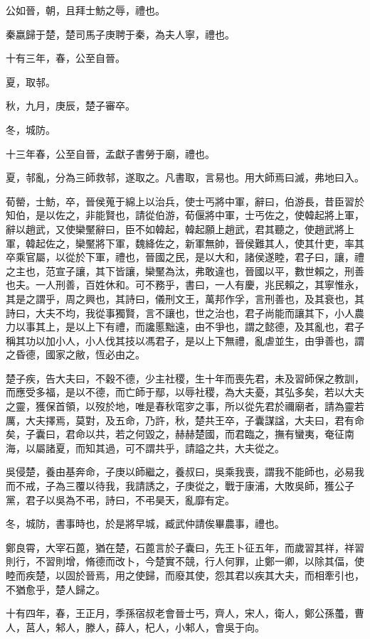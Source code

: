 \begin{pinyinscope}
公如晉，朝，且拜士魴之辱，禮也。

秦嬴歸于楚，楚司馬子庚聘于秦，為夫人寧，禮也。

十有三年，春，公至自晉。

夏，取邿。

秋，九月，庚辰，楚子審卒。

冬，城防。

十三年春，公至自晉，孟獻子書勞于廟，禮也。

夏，邿亂，分為三師救邿，遂取之。凡書取，言易也。用大師焉曰滅，弗地曰入。

荀罃，士魴，卒，晉侯蒐于綿上以治兵，使士丐將中軍，辭曰，伯游長，昔臣習於知伯，是以佐之，非能賢也，請從伯游，荀偃將中軍，士丐佐之，使韓起將上軍，辭以趙武，又使欒黶辭曰，臣不如韓起，韓起願上趙武，君其聽之，使趙武將上軍，韓起佐之，欒黶將下軍，魏絳佐之，新軍無帥，晉侯難其人，使其什吏，率其卒乘官屬，以從於下軍，禮也，晉國之民，是以大和，諸侯遂睦，君子曰，讓，禮之主也，范宣子讓，其下皆讓，欒黶為汰，弗敢違也，晉國以平，數世賴之，刑善也夫。一人刑善，百姓休和。可不務乎，書曰，一人有慶，兆民賴之，其寧惟永，其是之謂乎，周之興也，其詩曰，儀刑文王，萬邦作孚，言刑善也，及其衰也，其詩曰，大夫不均，我從事獨賢，言不讓也，世之治也，君子尚能而讓其下，小人農力以事其上，是以上下有禮，而讒慝黜遠，由不爭也，謂之懿德，及其亂也，君子稱其功以加小人，小人伐其技以馮君子，是以上下無禮，亂虐並生，由爭善也，謂之昏德，國家之敝，恆必由之。

楚子疾，告大夫曰，不穀不德，少主社稷，生十年而喪先君，未及習師保之教訓，而應受多福，是以不德，而亡師于鄢，以辱社稷，為大夫憂，其弘多矣，若以大夫之靈，獲保首領，以歿於地，唯是春秋窀穸之事，所以從先君於禰廟者，請為靈若厲，大夫擇焉，莫對，及五命，乃許，秋，楚共王卒，子囊謀諡，大夫曰，君有命矣，子囊曰，君命以共，若之何毀之，赫赫楚國，而君臨之，撫有蠻夷，奄征南海，以屬諸夏，而知其過，可不謂共乎，請謚之共，大夫從之。

吳侵楚，養由基奔命，子庚以師繼之，養叔曰，吳乘我喪，謂我不能師也，必易我而不戒，子為三覆以待我，我請誘之，子庚從之，戰于康浦，大敗吳師，獲公子黨，君子以吳為不弔，詩曰，不弔昊天，亂靡有定。

冬，城防，書事時也，於是將早城，臧武仲請俟畢農事，禮也。

鄭良霄，大宰石蓖，猶在楚，石蓖言於子囊曰，先王卜征五年，而歲習其祥，祥習則行，不習則增，脩德而改卜，今楚實不競，行人何罪，止鄭一卿，以除其偪，使睦而疾楚，以固於晉焉，用之使歸，而廢其使，怨其君以疾其大夫，而相牽引也，不猶愈乎，楚人歸之。

十有四年，春，王正月，季孫宿叔老會晉士丐，齊人，宋人，衛人，鄭公孫蠆，曹人，莒人，邾人，滕人，薛人，杞人，小邾人，會吳于向。


\end{pinyinscope}
